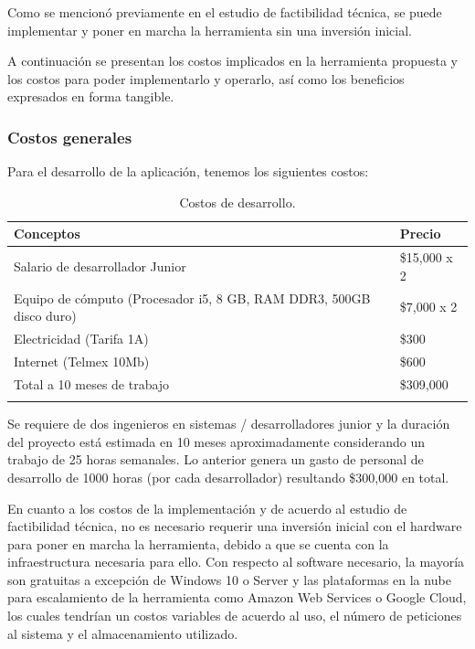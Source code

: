 \vspace{1em}

\noindent
Como se mencionó previamente en el estudio de factibilidad técnica, se puede implementar y poner en marcha la herramienta sin una inversión inicial.

\vspace{1em}

\noindent
A continuación se presentan los costos implicados en la herramienta propuesta y los costos para poder implementarlo y operarlo, así como los beneficios expresados en forma tangible.



\subsubsection{Costos generales}
\noindent
Para el desarrollo de la aplicación, tenemos los siguientes costos:

\begin{longtable}[c]{|p{13cm}|p{3.5cm}|}
\hline\textbf{Conceptos} & \textbf{Precio} \\ \hline
Salario de desarrollador Junior \cite{E06}
& \$15,000 x 2 \\ \hline
Equipo de cómputo (Procesador i5, 8 GB, RAM DDR3, 500GB disco duro)
& \$7,000 x 2\\ \hline
Electricidad (Tarifa 1A)
& \$300 \\ \hline
Internet (Telmex 10Mb)
& \$600 \\ \hline
Total a 10 meses de trabajo
& \$309,000 \\ \hline
\caption{Costos de desarrollo.}
\label{table:1}
\end{longtable}

\noindent
Se requiere de dos ingenieros en sistemas / desarrolladores junior y la duración del proyecto está estimada en 10 meses aproximadamente considerando un trabajo de 25 horas semanales. Lo anterior genera un gasto de personal de desarrollo de 1000 horas (por cada desarrollador) resultando \$300,000 en total.

\vspace{1em}

\noindent
En cuanto a los costos de la implementación y de acuerdo al estudio de factibilidad técnica, no es necesario requerir una inversión inicial con el hardware para poner en marcha la herramienta, debido a que se cuenta con la infraestructura necesaria para ello. Con respecto al software necesario, la mayoría son gratuitas a excepción de Windows 10 o Server y las plataformas en la nube para escalamiento de la herramienta como Amazon Web Services o Google Cloud, los cuales tendrían un costos variables de acuerdo al uso, el número de peticiones al sistema y el almacenamiento utilizado.


